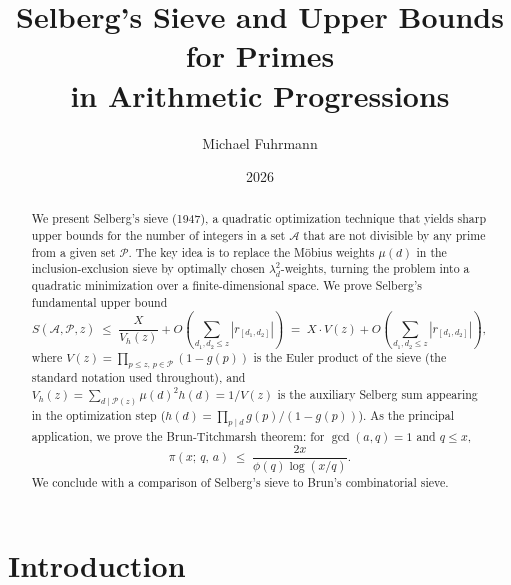 \documentclass[12pt,a4paper]{amsart}
\theoremstyle{definition}
\begin{document}

\title{Selberg's Sieve and Upper Bounds for Primes\\
       in Arithmetic Progressions}

\author{Michael Fuhrmann}
\address{Specialist Mathematics Project, Build 74}
\date{2026}

\begin{abstract}
We present Selberg's sieve (1947), a quadratic optimization technique that
yields sharp upper bounds for the number of integers in a set $\mathcal{A}$
that are not divisible by any prime from a given set $\mathcal{P}$.  The key
idea is to replace the M\"obius weights $\mu(d)$ in the inclusion-exclusion
sieve by optimally chosen $\lambda_d^2$-weights, turning the problem into a
quadratic minimization over a finite-dimensional space.  We prove Selberg's
fundamental upper bound
\[
  S(\mathcal{A},\mathcal{P},z)
  \;\leq\; \frac{X}{V_h(z)} + O\!\left(\sum_{d_1,d_2 \leq z} |r_{[d_1,d_2]}|\right)
  \;=\; X \cdot V(z) + O\!\left(\sum_{d_1,d_2 \leq z} |r_{[d_1,d_2]}|\right),
\]
where $V(z) = \prod_{p \leq z,\,p \in \mathcal{P}}(1-g(p))$ is the Euler product
of the sieve (the standard notation used throughout), and
$V_h(z) = \sum_{d \mid \mathcal{P}(z)} \mu(d)^2 h(d) = 1/V(z)$ is the
auxiliary Selberg sum appearing in the optimization step ($h(d) = \prod_{p \mid d} g(p)/(1-g(p))$).
As the principal application, we prove the Brun-Titchmarsh theorem:
for $\gcd(a,q) = 1$ and $q \leq x$,
\[
  \pi(x;\,q,\,a) \;\leq\; \frac{2x}{\phi(q)\log(x/q)}.
\]
We conclude with a comparison of Selberg's sieve to Brun's combinatorial sieve.
\end{abstract}

\maketitle
\tableofcontents

\section{Introduction}
\end{document}
